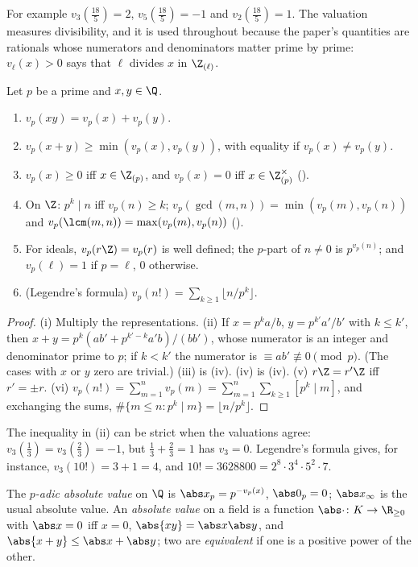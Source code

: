 For example $v_3(\frac{18}5)=2$, $v_5(\frac{18}5)=-1$ and $v_2(\frac{18}5)=1$. The valuation measures divisibility, and it is used throughout because the
paper's quantities are rationals whose numerators and denominators matter prime by prime: $v_\ell(x)>0$ says that $\ell$ divides $x$ in
$\Z_{(\ell)}$.

\begin{proposition}\label{prop:rings:valuation}
Let $p$ be a prime and $x,y\in\Q$.
\begin{enumerate}[label=(\roman*)]
\item $v_p(xy)=v_p(x)+v_p(y)$.
\item $v_p(x+y)\ge\min(v_p(x),v_p(y))$, with equality if $v_p(x)\ne v_p(y)$.
\item $v_p(x)\ge0$ iff $x\in\Z_{(p)}$, and $v_p(x)=0$ iff $x\in\Z_{(p)}^\times$ ().
\item On $\Z$: $p^k\mid n$ iff $v_p(n)\ge k$; $v_p(\gcd(m,n))=\min(v_p(m),v_p(n))$ and $v_p(\lcm(m,n))=\max(v_p(m),v_p(n))$ ().
\item For ideals, $v_p(r\Z)=v_p(r)$ is well defined; the $p$-part of $n\ne0$ is $p^{v_p(n)}$; and $v_p(\ell)=1$ if $p=\ell$, $0$ otherwise.
\item (Legendre's formula) $v_p(n!)=\sum_{k\ge1}\lfloor n/p^k\rfloor$.
\end{enumerate}
\end{proposition}

\begin{proof}
(i) Multiply the representations. (ii) If $x=p^ka/b$, $y=p^{k'}a'/b'$ with $k\le k'$, then $x+y=p^k(ab'+p^{k'-k}a'b)/(bb')$, whose numerator is an integer and
denominator prime to $p$; if $k<k'$ the numerator is $\equiv ab'\not\equiv0\pmod p$. (The cases with $x$ or $y$ zero are trivial.) (iii) is
(iv). (iv) is (iv). (v) $r\Z=r'\Z$ iff $r'=\pm r$. (vi) $v_p(n!)=\sum_{m=1}^nv_p(m)=\sum_{m=1}^n\sum_{k\ge1}[p^k\mid m]$, and
exchanging the sums, $\#\{m\le n:p^k\mid m\}=\lfloor n/p^k\rfloor$.
\end{proof}

The inequality in (ii) can be strict when the valuations agree: $v_3(\frac13)=v_3(\frac23)=-1$, but $\frac13+\frac23=1$ has $v_3=0$. Legendre's formula gives, for
instance, $v_3(10!)=3+1=4$, and $10!=3628800=2^8\cdot3^4\cdot5^2\cdot7$.

\begin{definition}\label{def:rings:padic-abs}
The \emph{$p$-adic absolute value} on $\Q$ is $\abs x_p=p^{-v_p(x)}$, $\abs0_p=0$; $\abs x_\infty$ is the usual absolute value. An \emph{absolute value} on a field is
a function $\abs\cdot\colon K\to\R_{\ge0}$ with $\abs x=0$ iff $x=0$, $\abs{xy}=\abs x\abs y$, and $\abs{x+y}\le\abs x+\abs y$; two are \emph{equivalent} if one is a positive power of
the other.
\end{definition}

